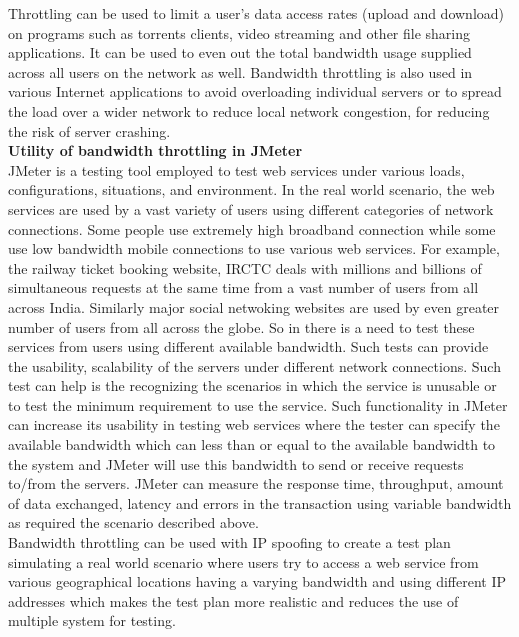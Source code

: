 \documentclass[12pt]{book}
\begin{document}
Throttling can be used to limit a user's data access rates (upload and download) on programs such as
torrents clients, video streaming and other file sharing applications. It can be used to even out the
total bandwidth usage supplied across all users on the network as well. Bandwidth throttling is
also used in various Internet applications to avoid overloading individual servers or to spread the load over a wider network to reduce
local network congestion, for reducing the risk of server crashing.\\

\textbf{Utility of bandwidth throttling in JMeter}\\
JMeter is a testing tool employed to test web services under various loads, configurations,
situations, and environment. In the real world scenario, the web services are used by a vast
variety of users using different categories of network connections. Some people use extremely
high broadband connection while some use low bandwidth mobile connections to use various
web services. For example, the railway ticket booking website, IRCTC deals with millions and
billions of simultaneous requests at the same time from a vast number of users from all across
India. Similarly major social netwoking websites are used by even greater number of users from
all across the globe. So in there is a need to test these services from users using different
available bandwidth. Such tests can provide the usability, scalability of the servers under
different network connections. Such test can help is the recognizing the scenarios in which the
service is unusable or to test the minimum requirement to use the service. Such functionality in
JMeter can increase its usability in testing web services where the tester can specify the available
bandwidth which can less than or equal to the available bandwidth to the system and JMeter will
use this bandwidth to send or receive requests to/from the servers. JMeter can measure the
response time, throughput, amount of data exchanged, latency and errors in the transaction using
variable bandwidth as required the scenario described above.\\
Bandwidth throttling can be used with IP spoofing to create a test plan simulating a real world
scenario where users try to access a web service from various geographical locations having a
varying bandwidth and using different IP addresses which makes the test plan more realistic and
reduces the use of multiple system for testing.\cite{Comp}
\end{document}
